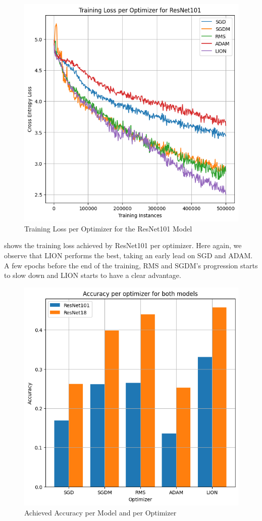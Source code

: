\documentclass[10pt,conference,compsocconf]{IEEEtran}
\begin{document}
\begin{figure}[htbp]
  \centering
  \includegraphics[width=0.8\columnwidth]{train_loss_101}
  \caption{Training Loss per Optimizer for the ResNet101 Model}
  \vspace{-3mm}
  \label{train_loss_101}
\end{figure}

 shows the training loss achieved by ResNet101 per optimizer. Here again, we observe that LION performs the best, taking an early lead on SGD and ADAM. A few epochs before the end of the training, RMS and SGDM's progression starts to slow down and LION starts to have a clear advantage.

\begin{figure}[htbp]
  \centering
  \includegraphics[width=0.8\columnwidth]{acc}
  \caption{Achieved Accuracy per Model and per Optimizer}
  \vspace{-3mm}
  \label{acc}
\end{figure}
\end{document}

